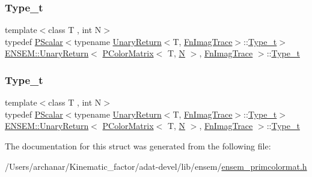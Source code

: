 \subsubsection{\texorpdfstring{Type\_t}{Type\_t}\hspace{0.1cm}{\footnotesize\ttfamily [2/3]}}
{\footnotesize\ttfamily template$<$class T , int N$>$ \\
typedef \mbox{\hyperlink{classENSEM_1_1PScalar}{P\+Scalar}}$<$typename \mbox{\hyperlink{structENSEM_1_1UnaryReturn}{Unary\+Return}}$<$T, \mbox{\hyperlink{structENSEM_1_1FnImagTrace}{Fn\+Imag\+Trace}}$>$\+::\mbox{\hyperlink{structENSEM_1_1UnaryReturn_3_01PColorMatrix_3_01T_00_01N_01_4_00_01FnImagTrace_01_4_a8af03bca3da42c1840803fcbcdf3ad74}{Type\+\_\+t}}$>$ \mbox{\hyperlink{structENSEM_1_1UnaryReturn}{E\+N\+S\+E\+M\+::\+Unary\+Return}}$<$ \mbox{\hyperlink{classENSEM_1_1PColorMatrix}{P\+Color\+Matrix}}$<$ T, \mbox{\hyperlink{adat__devel_2lib_2hadron_2operator__name__util_8cc_a7722c8ecbb62d99aee7ce68b1752f337}{N}} $>$, \mbox{\hyperlink{structENSEM_1_1FnImagTrace}{Fn\+Imag\+Trace}} $>$\+::\mbox{\hyperlink{structENSEM_1_1UnaryReturn_3_01PColorMatrix_3_01T_00_01N_01_4_00_01FnImagTrace_01_4_a8af03bca3da42c1840803fcbcdf3ad74}{Type\+\_\+t}}}

\mbox{\label{structENSEM_1_1UnaryReturn_3_01PColorMatrix_3_01T_00_01N_01_4_00_01FnImagTrace_01_4_a8af03bca3da42c1840803fcbcdf3ad74}} 
\subsubsection{\texorpdfstring{Type\_t}{Type\_t}\hspace{0.1cm}{\footnotesize\ttfamily [3/3]}}
{\footnotesize\ttfamily template$<$class T , int N$>$ \\
typedef \mbox{\hyperlink{classENSEM_1_1PScalar}{P\+Scalar}}$<$typename \mbox{\hyperlink{structENSEM_1_1UnaryReturn}{Unary\+Return}}$<$T, \mbox{\hyperlink{structENSEM_1_1FnImagTrace}{Fn\+Imag\+Trace}}$>$\+::\mbox{\hyperlink{structENSEM_1_1UnaryReturn_3_01PColorMatrix_3_01T_00_01N_01_4_00_01FnImagTrace_01_4_a8af03bca3da42c1840803fcbcdf3ad74}{Type\+\_\+t}}$>$ \mbox{\hyperlink{structENSEM_1_1UnaryReturn}{E\+N\+S\+E\+M\+::\+Unary\+Return}}$<$ \mbox{\hyperlink{classENSEM_1_1PColorMatrix}{P\+Color\+Matrix}}$<$ T, \mbox{\hyperlink{adat__devel_2lib_2hadron_2operator__name__util_8cc_a7722c8ecbb62d99aee7ce68b1752f337}{N}} $>$, \mbox{\hyperlink{structENSEM_1_1FnImagTrace}{Fn\+Imag\+Trace}} $>$\+::\mbox{\hyperlink{structENSEM_1_1UnaryReturn_3_01PColorMatrix_3_01T_00_01N_01_4_00_01FnImagTrace_01_4_a8af03bca3da42c1840803fcbcdf3ad74}{Type\+\_\+t}}}



The documentation for this struct was generated from the following file\+:\begin{DoxyCompactItemize}
\item 
/\+Users/archanar/\+Kinematic\+\_\+factor/adat-\/devel/lib/ensem/\mbox{\hyperlink{adat-devel_2lib_2ensem_2ensem__primcolormat_8h}{ensem\+\_\+primcolormat.\+h}}\end{DoxyCompactItemize}
